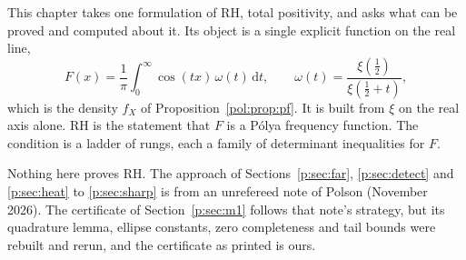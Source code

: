 \label{p:ch:path}

This chapter takes one formulation of RH, total positivity, and asks what can be proved and computed about it. Its object is a single explicit function on the real line,
\[
F(x)=\frac1\pi\int_0^\infty\cos(tx)\,\omega(t)\,\mathrm dt,\qquad \omega(t)=\frac{\xi(\frac12)}{\xi(\frac12+t)},
\]
which is the density $f_X$ of Proposition~\ref{pol:prop:pf}. It is built from $\xi$ on the real axis alone. RH is the statement that $F$ is a P\'olya frequency function. The condition is a ladder of rungs, each a family of determinant inequalities for $F$.

Nothing here proves RH. The approach of Sections~\ref{p:sec:far}, \ref{p:sec:detect} and \ref{p:sec:heat} to \ref{p:sec:sharp} is from an unrefereed note of Polson (November 2026). The certificate of Section~\ref{p:sec:m1} follows that note's strategy, but its quadrature lemma, ellipse constants, zero completeness and tail bounds were rebuilt and rerun, and the certificate as printed is ours.

